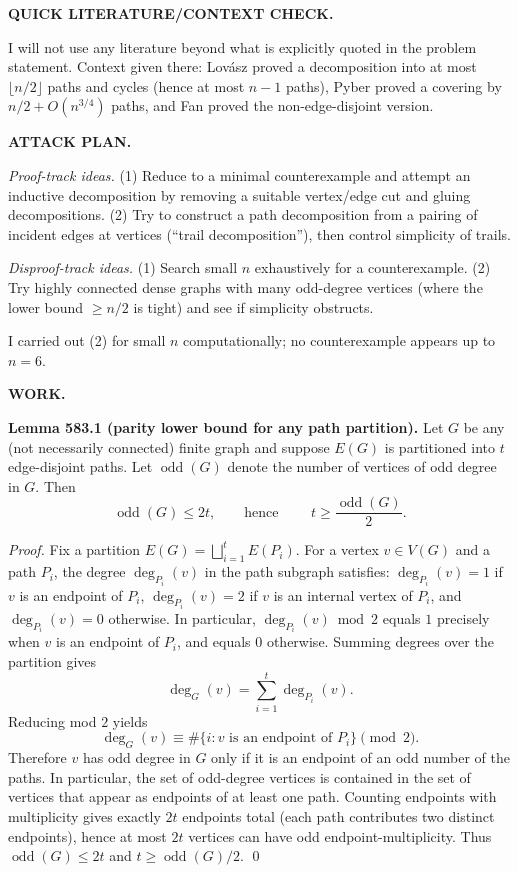 \bigskip
\noindent\textbf{QUICK LITERATURE/CONTEXT CHECK.}

I will not use any literature beyond what is explicitly quoted in the problem statement.
Context given there: Lov\'asz proved a decomposition into at most $\lfloor n/2\rfloor$ paths and cycles (hence at most $n-1$ paths), Pyber proved a covering by $n/2+O(n^{3/4})$ paths, and Fan proved the non-edge-disjoint version.

\bigskip
\noindent\textbf{ATTACK PLAN.}

\emph{Proof-track ideas.}
(1) Reduce to a minimal counterexample and attempt an inductive decomposition by removing a suitable vertex/edge cut and gluing decompositions.
(2) Try to construct a path decomposition from a pairing of incident edges at vertices (``trail decomposition''), then control simplicity of trails.

\emph{Disproof-track ideas.}
(1) Search small $n$ exhaustively for a counterexample.
(2) Try highly connected dense graphs with many odd-degree vertices (where the lower bound $\ge n/2$ is tight) and see if simplicity obstructs.

I carried out (2) for small $n$ computationally; no counterexample appears up to $n=6$.

\bigskip
\noindent\textbf{WORK.}

\noindent\textbf{Lemma 583.1 (parity lower bound for any path partition).}
Let $G$ be any (not necessarily connected) finite graph and suppose $E(G)$ is partitioned into $t$ edge-disjoint paths. Let $\operatorname{odd}(G)$ denote the number of vertices of odd degree in $G$. Then
\[
\operatorname{odd}(G)\le 2t,\qquad\text{hence }\qquad t\ge \frac{\operatorname{odd}(G)}2.
\]

\noindent\emph{Proof.}
Fix a partition $E(G)=\bigsqcup_{i=1}^t E(P_i)$.
For a vertex $v\in V(G)$ and a path $P_i$, the degree $\deg_{P_i}(v)$ in the path subgraph satisfies:
$\deg_{P_i}(v)=1$ if $v$ is an endpoint of $P_i$, $\deg_{P_i}(v)=2$ if $v$ is an internal vertex of $P_i$, and $\deg_{P_i}(v)=0$ otherwise.
In particular, $\deg_{P_i}(v)\bmod 2$ equals $1$ precisely when $v$ is an endpoint of $P_i$, and equals $0$ otherwise.
Summing degrees over the partition gives
\[
\deg_G(v)=\sum_{i=1}^t \deg_{P_i}(v).
\]
Reducing mod $2$ yields
\[
\deg_G(v)\equiv \#\{i: v \text{ is an endpoint of }P_i\}\pmod 2.
\]
Therefore $v$ has odd degree in $G$ only if it is an endpoint of an odd number of the paths.
In particular, the set of odd-degree vertices is contained in the set of vertices that appear as endpoints of at least one path.
Counting endpoints with multiplicity gives exactly $2t$ endpoints total (each path contributes two distinct endpoints), hence at most $2t$ vertices can have odd endpoint-multiplicity.
Thus $\operatorname{odd}(G)\le 2t$ and $t\ge \operatorname{odd}(G)/2$.
\qed

